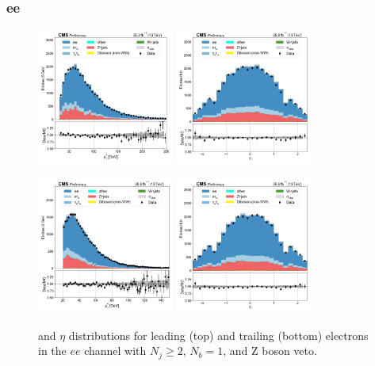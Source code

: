
\subsubsection{ee}

\begin{figure}[htb!]
    \centering
    \includegraphics[width=0.4\textwidth]{chapters/Appendix/sectionPlots/figures/data_mc_overlays/ee_2016_cat_gt2_eq1_b_signal_linear_lepton_lepton1_pt}
    \includegraphics[width=0.4\textwidth]{chapters/Appendix/sectionPlots/figures/data_mc_overlays/ee_2016_cat_gt2_eq1_b_signal_linear_lepton_lepton1_eta}

    \includegraphics[width=0.4\textwidth]{chapters/Appendix/sectionPlots/figures/data_mc_overlays/ee_2016_cat_gt2_eq1_b_signal_linear_lepton_lepton2_pt}
    \includegraphics[width=0.4\textwidth]{chapters/Appendix/sectionPlots/figures/data_mc_overlays/ee_2016_cat_gt2_eq1_b_signal_linear_lepton_lepton2_eta}
    \caption{\pt and $\eta$ distributions for leading (top) and trailing
    (bottom) electrons in the $ee$ channel with $N_{j} \geq 2$, $N_{b}
    = 1$, and Z boson veto.}
    \label{fig:ee_1_kinematic}
\end{figure}

